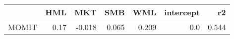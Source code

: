 \begin{tabular}{lrrrrrr}
\toprule
{} &   HML &    MKT &    SMB &    WML &  intercept &     r2 \\
\midrule
MOMIT &  0.17 & -0.018 &  0.065 &  0.209 &        0.0 &  0.544 \\
\bottomrule
\end{tabular}

